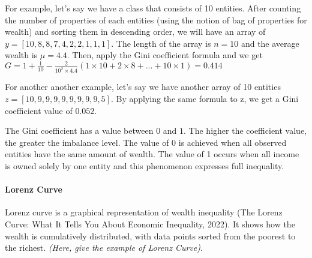 For example, let's say we have a class that consists of 10 entities. After counting the number of properties of each entities (using the notion of bag of properties for wealth) and sorting them in descending order, we will have an array of \(y = [10,8,8,7,4,2,2,1,1,1]\). The length of the array is \(n = 10\) and the average wealth is \(\mu = 4.4\). Then, apply the Gini coefficient formula and we get \(G = 1 + \frac{1}{10} - \frac{2}{10^{2}\times4.4}(1\times10 + 2\times8 + ... + 10\times1) = 0.414\)

For another another example, let's say we have another array of 10 entities \(z = [10, 9, 9, 9, 9, 9, 9, 9, 9, 5]\). By applying the same formula to z, we get a Gini coefficient value of \(0.052\).

The Gini coefficient has a value between \(0\) and \(1\). The higher the coefficient value, the greater the imbalance level. The value of 0 is achieved when all observed entities have the same amount of wealth. The value of 1 occurs when all income is owned solely by one entity and this phenomenon expresses full inequality.


\paragraph{Lorenz Curve} Lorenz curve is a graphical representation of wealth inequality (The Lorenz Curve: What It Tells You About Economic Inequality, 2022). It shows how the wealth is cumulatively distributed, with data points sorted from the poorest to the richest. \textit{(Here, give the example of Lorenz Curve)}. 

